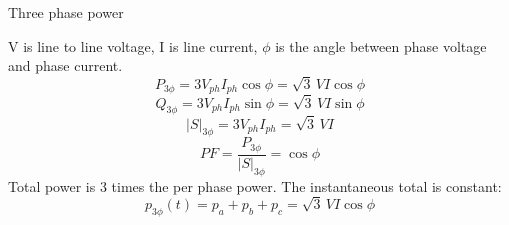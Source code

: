 Three phase power

V is line to line voltage, I is line current, $\phi$ is the angle between phase voltage and phase current.
$$P_{3\phi}=3V_{ph}I_{ph}\cos\phi=\sqrt{3}\,VI\cos\phi$$
$$Q_{3\phi}=3V_{ph}I_{ph}\sin\phi=\sqrt{3}\,VI\sin\phi$$
$$\left|S\right|_{3\phi}=3V_{ph}I_{ph}=\sqrt{3}\,VI$$
$$PF=\frac{P_{3\phi}}{\left|S\right|_{3\phi}}=\cos\phi$$
Total power is 3 times the per phase power. The instantaneous total is constant:
$$p_{3\phi}(t)=p_a+p_b+p_c=\sqrt{3}\,VI\cos\phi$$
